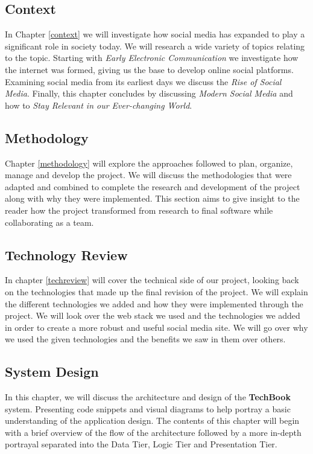 \subsection{Context}
In Chapter \ref{context} we will investigate how social media has expanded to play a significant role in society today. We will research a wide variety of topics relating to the topic. Starting with \textit{Early Electronic Communication} we investigate how the internet was formed, giving us the base to develop online social platforms. Examining social media from its earliest days we discuss the \textit{Rise of Social Media}. Finally, this chapter concludes by discussing \textit{Modern Social Media} and how to \textit{Stay Relevant in our Ever-changing World}.

\subsection{Methodology}
Chapter \ref{methodology} will explore the approaches followed to plan, organize, manage and develop the project. We will discuss the methodologies that were adapted and combined to complete the research and development of the project along with why they were implemented. This section aims to give insight to the reader how the project transformed from research to final software while collaborating as a team.

\subsection{Technology Review}
In chapter \ref{techreview} will cover the technical side of our project, looking back on the technologies that made up the final revision of the project. We will explain the different technologies we added and how they were implemented through the project. We will look over the web stack we used and the technologies we added in order to create a more robust and useful social media site. We will go over why we used the given technologies and the benefits we saw in them over others.

\subsection{System Design}
In this chapter, we will discuss the architecture and design of the \textbf{TechBook} system. Presenting code snippets and visual diagrams to help portray a basic understanding of the application design. The contents of this chapter will begin with a brief overview of the flow of the architecture followed by a more in-depth portrayal separated into the Data Tier, Logic Tier and Presentation Tier.

